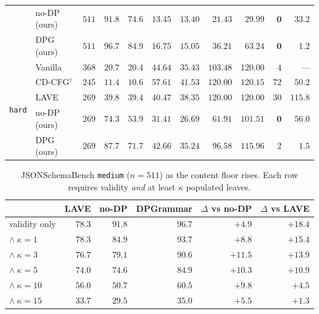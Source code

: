 \documentclass{article}
\begin{document}
\begin{table}[t]
\begin{tabular}{llrrrrrrrrr}
 & no-DP (ours)      & $511$ & $91.8$ & $74.6$ & $\mathbf{13.45}$ & $\mathbf{13.40}$ & $\mathbf{21.43}$ & $\mathbf{29.99}$ & $\mathbf{0}$ & $33.2$ \\
 & DPG (ours)        & $511$ & $\mathbf{96.7}$ & $\mathbf{84.9}$ & $16.75$ & $15.05$ & $36.21$ & $63.24$ & $\mathbf{0}$ & $\mathbf{1.2}$ \\
\midrule
\multirow{5}{*}{\texttt{hard}}
 & Vanilla           & $368$ & $20.7$ & $20.4$ & $44.64$ & $35.43$ & $103.48$ & $120.00$ & $4$ & --- \\
 & CD-CFG$^\dagger$  & $245$ & $11.4$ & $10.6$ & $57.61$ & $41.53$ & $120.00$ & $120.15$ & $72$ & $50.2$ \\
 & LAVE              & $269$ & $39.8$ & $39.4$ & $40.47$ & $38.35$ & $120.00$ & $120.00$ & $30$ & $115.8$ \\
 & no-DP (ours)      & $269$ & $74.3$ & $53.9$ & $\mathbf{31.41}$ & $\mathbf{26.69}$ & $\mathbf{61.91}$ & $\mathbf{101.51}$ & $\mathbf{0}$ & $56.0$ \\
 & DPG (ours)        & $269$ & $\mathbf{87.7}$ & $\mathbf{71.7}$ & $42.66$ & $35.24$ & $96.58$ & $115.96$ & $2$ & $\mathbf{1.5}$ \\
\bottomrule
\end{tabular}
\end{table}

\begin{table}[h]
\centering
\small
\caption{JSONSchemaBench \texttt{medium} ($n{=}511$) as the content floor
rises. Each row requires validity \emph{and} at least $\kappa$ populated leaves.}
\label{tab:main}
\begin{tabular}{lrrrrr}
\toprule
 & LAVE & no-DP & \textbf{DPGrammar} & $\Delta$ vs no-DP & $\Delta$ vs LAVE \\
\midrule
validity only        & $78.3$ & $91.8$ & $\mathbf{96.7}$ & $+4.9$  & $+18.4$ \\
$\wedge\ \kappa{=}1$  & $78.3$ & $84.9$ & $\mathbf{93.7}$ & $+8.8$  & $+15.4$ \\
$\wedge\ \kappa{=}3$  & $76.7$ & $79.1$ & $\mathbf{90.6}$ & $\mathbf{+11.5}$ & $+13.9$ \\
$\wedge\ \kappa{=}5$  & $74.0$ & $74.6$ & $\mathbf{84.9}$ & $+10.3$ & $+10.9$ \\
$\wedge\ \kappa{=}10$ & $56.0$ & $50.7$ & $\mathbf{60.5}$ & $+9.8$  & $+4.5$ \\
$\wedge\ \kappa{=}15$ & $33.7$ & $29.5$ & $\mathbf{35.0}$ & $+5.5$  & $+1.3$ \\
\bottomrule
\end{tabular}
\end{table}
\end{document}
